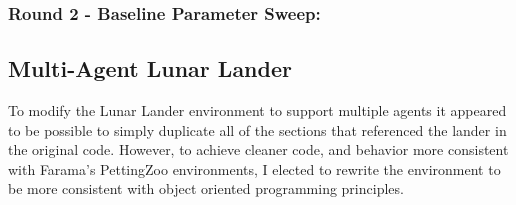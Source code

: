 \documentclass[12pt,letterpaper]{exam}
\begin{document}
\begin{questions}


	\subsubsection*{Round 2 - Baseline Parameter Sweep:}
	


\end{questions}

\subsection*{Multi-Agent Lunar Lander}
\label{sec:ma-lander}

To modify the Lunar Lander environment to support multiple 
agents it appeared to be possible to simply duplicate all of the
sections that referenced the lander in the original code.
However, to achieve cleaner code, and behavior more consistent with 
Farama's PettingZoo environments, I elected to rewrite the environment
to be more consistent with object oriented programming principles.
\end{document}
